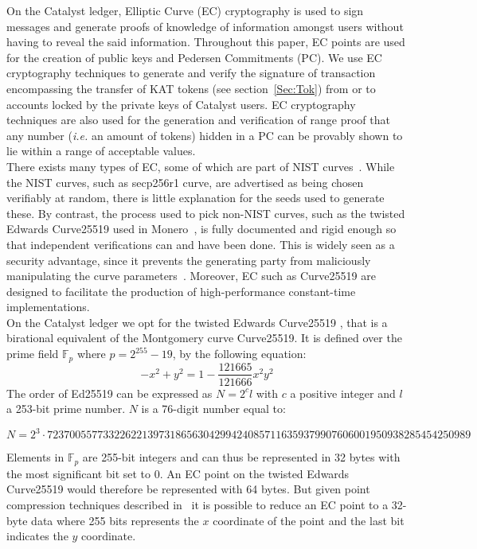 On the Catalyst ledger, Elliptic Curve (EC) cryptography is used to sign messages and generate proofs of knowledge of information amongst users without having to reveal the said information. Throughout this paper, EC points are used for the creation of public keys and Pedersen Commitments (PC). We use EC cryptography techniques to generate and verify the signature of transaction encompassing the transfer of KAT tokens (see section~\ref{Sec:Tok}) from or to accounts locked by the private keys of Catalyst users. EC cryptography techniques are also used for the generation and verification of range proof that any number (\textit{i.e.} an amount of tokens) hidden in a PC can be provably shown to lie within a range of acceptable values.\\
 
There exists many types of EC, some of which are part of NIST curves~\cite{Hankerson2011}. While the NIST curves, such as secp256r1 curve, are advertised as being chosen verifiably at random, there is little explanation for the seeds used to generate these. By contrast, the process used to pick non-NIST curves, such as the twisted Edwards Curve25519 used in Monero~\cite{monero}, is fully documented and rigid enough so that independent verifications can and have been done. This is widely seen as a security advantage, since it prevents the generating party from maliciously manipulating the curve parameters~\cite{NSA}. Moreover, EC such as Curve25519 are designed to facilitate the production of high-performance constant-time implementations. \\

On the Catalyst ledger we opt for the twisted Edwards Curve25519 \cite{ed25519}, that is a birational equivalent of the Montgomery curve Curve25519. It is defined over the prime field $\mathbb{F}_{p}$ where $p = 2^{255} - 19$, by the following equation:
\begin{equation}
-x^2+y^2=1-\frac{121665}{121666}x^2y^2
\end{equation}
The order of Ed25519 can be expressed as $N=2^cl$ with $c$ a positive integer and $l$ a 253-bit prime number. $N$ is a 76-digit number equal to:
\begin{center}
\begin{footnotesize}
$N=2^3\cdot 7237005577332262213973186563042994240857116359379907606001950938285454250989$
\end{footnotesize}
\end{center}

Elements in $\mathbb{F}_{p}$ are 255-bit integers and can thus be represented in 32 bytes with the most significant bit set to 0. An EC point on the twisted Edwards Curve25519 would therefore be represented with 64 bytes. But given point compression techniques described in~\cite{monero} it is possible to reduce an EC point to a 32-byte data where 255 bits represents the $x$ coordinate of the point and the last bit indicates the $y$ coordinate. \\


